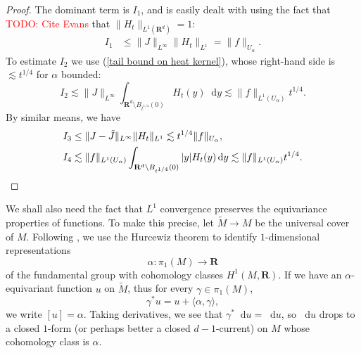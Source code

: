 \documentclass[reqno,11pt]{amsart}
\newcommand{\RR}{\mathbf{R}}
\newcommand*\dif{\mathop{}\!\mathrm{d}}
\theoremstyle{definition}
\numberwithin{equation}{section}
\newcommand\todo[1]{\textcolor{red}{TODO: #1}}
\begin{document}
\begin{proof}
The dominant term is $I_1$, and is easily dealt with using the fact that \todo{Cite Evans} that $\|H_t\|_{L^1(\RR^d)} = 1$:
\begin{align*}
I_1 &\leq \|J\|_{L^\infty} \|H_t\|_{L^1} = \|f\|_{U_\alpha}.
\end{align*}
To estimate $I_2$ we use (\ref{tail bound on heat kernel}), whose right-hand side is $\lesssim t^{1/4}$ for $\alpha$ bounded:
$$I_2 \lesssim \|J\|_{L^\infty} \int_{\RR^d \setminus B_{t^{1/4}}(0)} H_t(y) \dif y \lesssim  \|f\|_{L^1(U_\alpha)} t^{1/4}.$$
By similar means, we have
\begin{align*}
I_3 &\leq \|J - \tilde J\|_{L^\infty} \|H_t\|_{L^1} \lesssim t^{1/4} \|f\|_{U_\alpha}, \\
I_4 &\lesssim \|f\|_{L^1(U_\alpha)} \int_{\RR^d \setminus B_{t^{1/4}}(0)} |y| H_t(y) \dif y \lesssim \|f\|_{L^1(U_\alpha)} t^{1/4}. \qedhere
\end{align*}
\end{proof}

We shall also need the fact that $L^1$ convergence preserves the equivariance properties of functions.
To make this precise, let $\tilde M \to M$ be the universal cover of $M$.
Following \cite[\S4]{daskalopoulos2020transverse}, we use the Hurcewiz theorem to identify $1$-dimensional representations
$$\alpha: \pi_1(M) \to \RR$$
of the fundamental group with cohomology classes $H^1(M, \RR)$.
If we have an $\alpha$-equivariant function $u$ on $\tilde M$, thus for every $\gamma \in \pi_1(M)$,
$$\gamma^* u = u + \langle \alpha, \gamma\rangle,$$
we write $[u] = \alpha$.
Taking derivatives, we see that $\gamma^* \dif u = \dif u$, so $\dif u$ drops to a closed $1$-form (or perhaps better a closed $d-1$-current) on $M$ whose cohomology class is $\alpha$.
\end{document}

